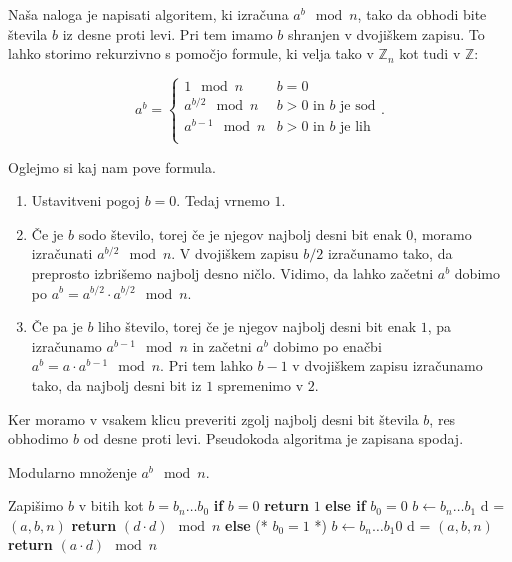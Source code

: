 \documentclass[fleqn]{article}
\begin{document}
Naša naloga je napisati algoritem, ki izračuna $a^b \mod n$, tako da obhodi bite števila $b$ iz desne proti levi.
Pri tem imamo $b$ shranjen v dvojiškem zapisu.
To lahko storimo rekurzivno s pomočjo formule, ki velja tako v $\mathbb{Z}_n$ kot tudi v $\mathbb{Z}$:

\[
   a^b = \begin{cases}
    1 \mod n & b = 0 \\
    a^{b/2} \mod n & \text{$b>0$ in $b$ je sod} \\
    a^{b-1} \mod n & \text{$b>0$ in $b$ je lih} \\
   \end{cases} \text{.}
\]

Oglejmo si kaj nam pove formula.
\begin{enumerate}
    \item Ustavitveni pogoj $b = 0$. Tedaj vrnemo $1$. 
    \item Če je $b$ sodo število, torej če je njegov najbolj desni bit enak $0$, moramo izračunati $a^{b/2} \mod n$. V dvojiškem zapisu $b/2$ izračunamo tako, da preprosto izbrišemo najbolj desno ničlo. Vidimo, da lahko začetni $a^b$ dobimo po $a^b = a^{b/2} \cdot a^{b/2} \mod n$.
    \item Če pa je $b$ liho število, torej če je njegov najbolj desni bit enak $1$, pa izračunamo  $a^{b-1} \mod n$ in začetni $a^b$ dobimo po enačbi $a^b = a \cdot a^{b-1} \mod n$. Pri tem lahko $b-1$ v dvojiškem zapisu izračunamo tako, da najbolj desni bit iz $1$ spremenimo v $2$.

\end{enumerate}

Ker moramo v vsakem klicu preveriti zgolj najbolj desni bit števila $b$, res obhodimo $b$ od desne proti levi.
Pseudokoda algoritma je zapisana spodaj.

\begin{algorithm}
    \caption{Modularno množenje $a^b \mod n$.}
    \begin{algorithmic}
            \State Zapišimo $b$ v bitih kot $b = b_n \dots b_0$
            \State \textbf{if} $b = 0$
            \State \qquad \textbf{return} $1$
            \State \textbf{else if} $b_0 = 0$  
            \State \qquad $b \leftarrow b_n \dots b_1$
            \State \qquad d =  $(a, b, n)$
            \State \qquad \textbf{return} $(d \cdot d) \mod n$
            \State \textbf{else} (* $b_0 = 1$ *)
            \State \qquad $b \leftarrow b_n \dots b_1 0$
            \State \qquad d =  $(a, b, n)$
            \State \qquad \textbf{return} $(a \cdot d) \mod n$
        \EndProcedure
        \end{algorithmic}    
\end{algorithm}
\end{document}
